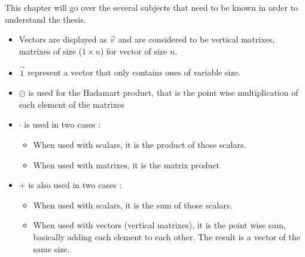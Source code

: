 \label{cap:state}

This chapter will go over the several subjects that need to be known in order to understand the thesis.

\begin{itemize}
  \item Vectors are displayed as $\overrightarrow{v}$ and are considered to be vertical matrixes, matrixes of size ($1\times n$) for vector of size $n$.
  \item $\overrightarrow{1}$ represent a vector that only contains ones of variable size.
  \item $\odot$ is used for the Hadamart product, that is the point wise multiplication of each element of the matrixes
  \item $\cdot$ is used in two cases :
    \begin{itemize}
      \item When used with scalars, it is the product of those scalars.
      \item When used with matrixes, it is the matrix product
    \end{itemize}
  \item $+$ is also used in two cases :
    \begin{itemize}
      \item When used with scalars, it is the sum of those scalars.
      \item When used with vectors (vertical matrixes), it is the point wise sum, basically adding each element to each other. The result is a vector of the same size.
    \end{itemize}
\end{itemize}











\cleardoublepage
